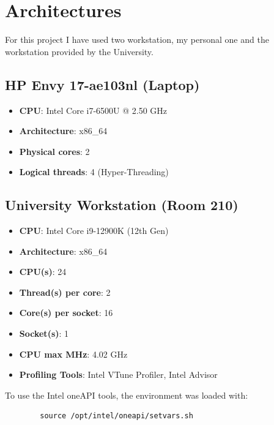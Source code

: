 \section{Architectures}
For this project I have used two workstation, my personal one and the workstation provided by the University.

\subsection*{HP Envy 17-ae103nl (Laptop)}
\begin{itemize}
    \item \textbf{CPU}: Intel Core i7-6500U @ 2.50 GHz
    \item \textbf{Architecture}: x86\_64
    \item \textbf{Physical cores}: 2
    \item \textbf{Logical threads}: 4 (Hyper-Threading)
\end{itemize}

\subsection*{University Workstation (Room 210)}
\begin{itemize}
    \item \textbf{CPU}: Intel Core i9-12900K (12th Gen)
    \item \textbf{Architecture}: x86\_64
    \item \textbf{CPU(s)}: 24
    \item \textbf{Thread(s) per core}: 2
    \item \textbf{Core(s) per socket}: 16
    \item \textbf{Socket(s)}: 1
    \item \textbf{CPU max MHz}: 4.02 GHz
    \item \textbf{Profiling Tools}: Intel VTune Profiler, Intel Advisor
\end{itemize}

To use the Intel oneAPI tools, the environment was loaded with:
\begin{verbatim}
        source /opt/intel/oneapi/setvars.sh
\end{verbatim}